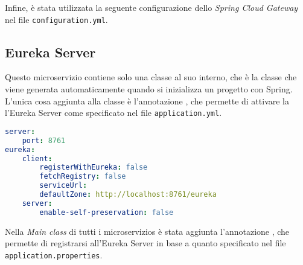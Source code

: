 

\noindent Infine, è stata utilizzata la seguente configurazione dello \textit{Spring Cloud Gateway} nel file \texttt{configuration.yml}.




\subsection{Eureka Server}
Questo \gls{microservizio} contiene solo una classe al suo interno, che è la classe che viene generata automaticamente quando si inizializza un progetto con Spring. L'unica cosa aggiunta alla classe è l'annotazione , che permette di  attivare la l'\gls{Eureka Server} come specificato nel file \texttt{application.yml}.

\begin{lstlisting}[language = yaml, caption = {File \texttt{application.yml} del microservizio \texttt{Eureka Server}}]
server:
    port: 8761
eureka:
    client:
        registerWithEureka: false 
        fetchRegistry: false
        serviceUrl:
        defaultZone: http://localhost:8761/eureka
    server:
        enable-self-preservation: false
\end{lstlisting}
\noindent Nella \textit{Main class} di tutti i \glspl{microservizio}  è stata aggiunta l'annotazione , che permette di registrarsi all'\gls{Eureka Server} in base a quanto specificato nel file \texttt{application.properties}.\\

